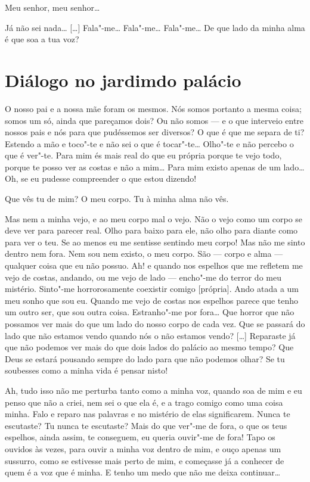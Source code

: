  Meu senhor, meu senhor\ldots{}

 Já não sei nada\ldots{} [\ldots{}] Fala"-me\ldots{} Fala"-me\ldots{} Fala"-me\ldots{}
De que lado da minha alma é que soa a tua voz?


\chapter[Diálogo no jardim do palácio]{Diálogo no jardim\break do palácio}

 O nosso pai e a nossa mãe foram os mesmos. Nós somos portanto a
mesma coisa; somos um só, ainda que pareçamos dois? Ou não somos --- e
o que interveio entre nossos pais e nós para que pudéssemos ser
diversos? O que é que me separa de ti? Estendo a mão e toco"-te e não
sei o que é tocar"-te\ldots{} Olho"-te e não percebo o que é ver"-te. Para
mim és mais real do que eu própria porque te vejo todo, porque te
posso ver as costas e não a mim\ldots{} Para mim existo apenas de um
lado\ldots{} Oh, se eu pudesse compreender o que estou dizendo!

 Que vês tu de mim? O meu corpo. Tu à minha alma não vês.

 Mas nem a minha vejo, e ao meu corpo mal o vejo. Não o vejo como um
corpo se deve ver para parecer real. Olho para baixo para ele, não
olho para diante como para ver o teu. Se ao menos eu me sentisse
sentindo meu corpo! Mas não me sinto dentro nem fora. Nem sou nem
existo, o meu corpo. São --- corpo e alma --- qualquer coisa que eu não
possuo.  Ah! e quando nos espelhos que me refletem me
vejo de costas, andando, ou me vejo de lado --- encho"-me do terror do
meu mistério. Sinto"-me horrorosamente coexistir comigo [própria].
Ando atada a um meu sonho que sou eu. Quando me vejo de costas nos
espelhos parece que tenho um outro ser, que sou outra coisa.
Estranho"-me por fora\ldots{} Que horror que não possamos ver mais do que
um lado do nosso corpo de cada vez. Que se passará do lado que não
estamos vendo quando nós o não estamos vendo? [\ldots{}] Reparaste já que
não podemos ver mais do que dois lados do palácio ao mesmo tempo? Que
Deus se estará pousando sempre do lado para que não podemos olhar? Se
tu soubesses como a minha vida é pensar nisto! 

 Ah, tudo isso não me perturba tanto como a minha voz, quando soa de
mim e eu penso que não a criei, nem sei o que ela é, e a trago comigo
como uma coisa minha. Falo e reparo nas palavras e no mistério de
elas significarem. Nunca te escutaste? Tu nunca te escutaste? Mais do
que ver"-me de fora, o que os teus espelhos, ainda assim, te
conseguem, eu queria ouvir"-me de fora! Tapo os ouvidos às vezes, para
ouvir a minha voz dentro de mim, e ouço apenas um sussurro, como se
estivesse mais perto de mim, e começasse já a conhecer de quem é a
voz que é minha. E tenho um medo que não me deixa continuar\ldots{}

